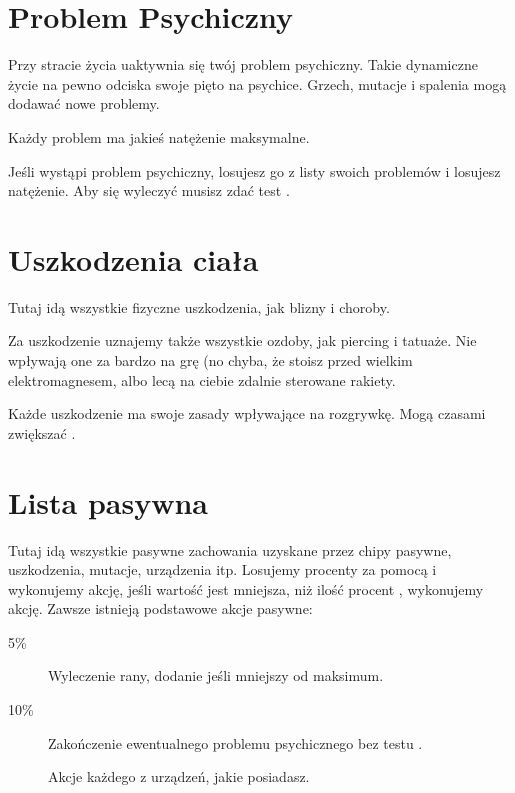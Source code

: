 \section{Problem Psychiczny}
Przy stracie życia uaktywnia się twój problem psychiczny.
Takie dynamiczne życie na pewno odciska swoje pięto na psychice. 
Grzech, mutacje i spalenia mogą dodawać nowe problemy.

Każdy problem ma jakieś natężenie maksymalne.

Jeśli wystąpi problem psychiczny, losujesz go z listy swoich problemów i losujesz natężenie.
Aby się wyleczyć musisz zdać test \abh.

\section{Uszkodzenia ciała}
Tutaj idą wszystkie fizyczne uszkodzenia, jak blizny i choroby.

Za uszkodzenie uznajemy także wszystkie ozdoby, jak piercing i tatuaże.
Nie wpływają one za bardzo na grę (no chyba, że stoisz przed wielkim elektromagnesem, albo lecą na ciebie zdalnie sterowane rakiety.

Każde uszkodzenie ma swoje zasady wpływające na rozgrywkę.
Mogą czasami zwiększać \abnkp.

\section{Lista pasywna}
Tutaj idą wszystkie pasywne zachowania uzyskane przez chipy pasywne, uszkodzenia, mutacje, urządzenia itp.
Losujemy procenty za pomocą \dc i wykonujemy akcję, jeśli wartość jest mniejsza, niż ilość procent , wykonujemy akcję.
Zawsze istnieją podstawowe akcje pasywne:
\begin{description}
\item[5\%] Wyleczenie rany, dodanie \abzyc jeśli mniejszy od maksimum.
\item[10\%] Zakończenie ewentualnego problemu psychicznego bez testu \abh.
\item[] Akcje każdego z urządzeń, jakie posiadasz.
\end{description}





